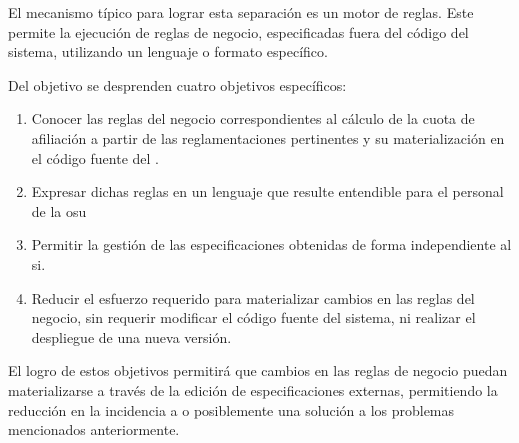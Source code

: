 El mecanismo típico para lograr esta separación es un motor de reglas. 
Este permite la ejecución de reglas de negocio, especificadas fuera del código del sistema, utilizando un lenguaje o formato específico.


Del objetivo se desprenden cuatro objetivos específicos:
\begin{enumerate}
    \item \label{obj:esp:extraer}
    Conocer las reglas del negocio correspondientes al cálculo de la cuota de afiliación a partir de las reglamentaciones pertinentes y su materialización en el código fuente del {\SIDOSPU}.
    \item \label{obj:esp:intelegible}
    Expresar dichas reglas en un lenguaje que resulte entendible para el personal de la \acrlong{osu}
    \item \label{obj:esp:independiente}
    Permitir la gestión de las especificaciones obtenidas de forma independiente al \acrshort{si}.
    \item \label{obj:esp:esfuerzo}
    Reducir el esfuerzo requerido para materializar cambios en las reglas del negocio, sin requerir modificar el código fuente del sistema, ni realizar el despliegue de una nueva versión.
\end{enumerate}

El logro de estos objetivos permitirá que cambios en las reglas de negocio puedan materializarse a través de la edición de especificaciones externas,  permitiendo la reducción en la incidencia a o posiblemente una solución a los problemas mencionados anteriormente.


